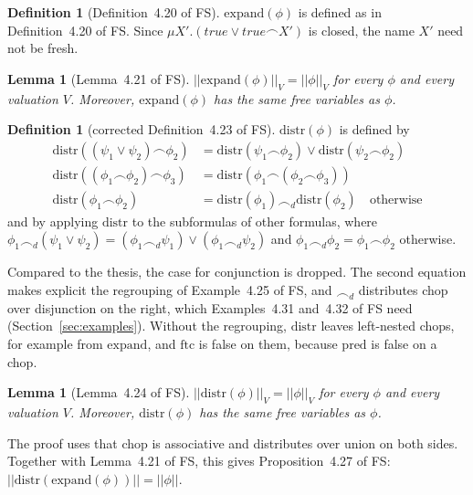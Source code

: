 \documentclass[11pt]{article}
\newcommand{\fsem}[1]{|\!|#1|\!|}
\newcommand{\chop}{\smallfrown}
\newcommand{\ftc}{\mathrm{ftc}}
\newcommand{\pred}{\mathrm{pred}}
\newcommand{\distr}{\mathrm{distr}}
\newcommand{\Th}[1]{#1 of FS}
\theoremstyle{plain}
\newtheorem{lemma}[theorem]{Lemma}
\theoremstyle{definition}
\newtheorem{definition}[theorem]{Definition}
\theoremstyle{remark}
\begin{document}
\begin{definition}[\Th{Definition~4.20}]\label{def:expand}
  $\mathrm{expand}(\phi)$ is defined as in \Th{Definition~4.20}. Since
  $\mu X'.(\mathit{true} \lor \mathit{true}\chop X')$ is closed, the name
  $X'$ need not be fresh.
\end{definition}

\begin{lemma}[\Th{Lemma~4.21}]
  $\fsem{\mathrm{expand}(\phi)}_V = \fsem{\phi}_V$ for every $\phi$ and
  every valuation $V$. Moreover, $\mathrm{expand}(\phi)$ has the same free
  variables as $\phi$.
\end{lemma}

\begin{definition}[corrected \Th{Definition~4.23}]\label{def:distr}
  $\distr(\phi)$ is defined by
  \begin{align*}
    \distr((\psi_1 \lor \psi_2)\chop\phi_2) &=
      \distr(\psi_1\chop\phi_2) \lor \distr(\psi_2\chop\phi_2)\\
    \distr((\phi_1\chop\phi_2)\chop\phi_3) &=
      \distr(\phi_1\chop(\phi_2\chop\phi_3))\\
    \distr(\phi_1\chop\phi_2) &= \distr(\phi_1) \chop_d \distr(\phi_2)
      \quad\text{otherwise}
  \end{align*}
  and by applying $\distr$ to the subformulas of other formulas, where
  $\phi_1 \chop_d (\psi_1 \lor \psi_2) = (\phi_1\chop_d\psi_1) \lor
  (\phi_1\chop_d\psi_2)$ and $\phi_1 \chop_d \phi_2 = \phi_1\chop\phi_2$
  otherwise.
\end{definition}

Compared to the thesis, the case for conjunction is dropped. The second
equation makes explicit the regrouping of \Th{Example~4.25}, and
$\chop_d$ distributes chop over disjunction on the right, which
\Th{Examples~4.31 and~4.32} need (Section~\ref{sec:examples}). Without the
regrouping, $\distr$ leaves left-nested chops, for example from
$\mathrm{expand}$, and $\ftc$ is false on them, because $\pred$ is false on
a chop.

\begin{lemma}[\Th{Lemma~4.24}]
  $\fsem{\distr(\phi)}_V = \fsem{\phi}_V$ for every $\phi$ and every
  valuation $V$. Moreover, $\distr(\phi)$ has the same free variables as
  $\phi$.
\end{lemma}

The proof uses that chop is associative and distributes over union on
both sides. Together with \Th{Lemma~4.21}, this gives
\Th{Proposition~4.27}: $\fsem{\distr(\mathrm{expand}(\phi))} =
\fsem{\phi}$.
\end{document}
